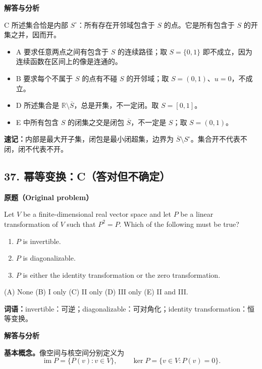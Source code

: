 \documentclass[11pt,a4paper,fontset=fandol]{ctexart}
\providecommand{\tightlist}{\setlength{\itemsep}{0pt}\setlength{\parskip}{0pt}}
\begin{document}
\textbf{解答与分析}\par


C 所述集合恰是内部 \(S^\circ\)：所有存在开邻域包含于 \(S\)
的点。它是所有包含于 \(S\) 的开集之并，因而开。

\begin{itemize}
\tightlist
\item
  A 要求任意两点之间有包含于 \(S\) 的连续路径；取 \(S=\{0,1\}\)
  即不成立，因为连续函数在区间上的像是连通的。
\item
  B 要求每个不属于 \(S\) 的点有不碰 \(S\) 的开邻域；取
  \(S=(0,1)\)、\(u=0\)，不成立。
\item
  D 所述集合是 \(\mathbb R\setminus\overline S\)，总是开集，不一定闭。取
  \(S=[0,1]\)。
\item
  E 中所有包含 \(S\) 的闭集之交是闭包 \(\overline S\)，不一定是
  \(S\)；取 \(S=(0,1)\)。
\end{itemize}

\textbf{速记：}内部是最大开子集，闭包是最小闭超集，边界为
\(\overline S\setminus S^\circ\)。集合开不代表不闭，闭不代表不开。

\hypertarget{ux5e42ux7b49ux53d8ux6362cux7b54ux5bf9ux4f46ux4e0dux786eux5b9a}{%
\subsection{37.
幂等变换：C（答对但不确定）}\label{ux5e42ux7b49ux53d8ux6362cux7b54ux5bf9ux4f46ux4e0dux786eux5b9a}}

\textbf{原题（Original problem）}\par
Let $V$ be a finite-dimensional real vector space and let $P$ be a linear transformation of $V$ such that $P^2=P$. Which of the following must be true?
\begin{enumerate}[label=\Roman*.]
\item $P$ is invertible. \item $P$ is diagonalizable. \item $P$ is either the identity transformation or the zero transformation.
\end{enumerate}
(A) None \quad (B) I only \quad (C) II only \quad (D) III only \quad (E) II and III.

\textbf{词语：}invertible：可逆；diagonalizable：可对角化；identity transformation：恒等变换。

\textbf{解答与分析}\par


\textbf{基本概念。}像空间与核空间分别定义为
\[
\operatorname{im}P=\{P(v):v\in V\},\qquad
\ker P=\{v\in V:P(v)=0\}.
\]
\end{document}
